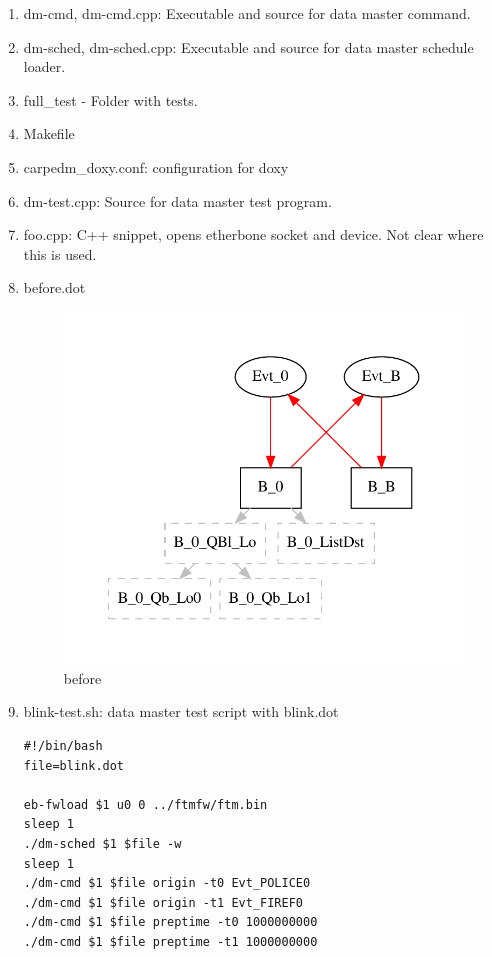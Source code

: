 \documentclass[12pt,a4paper]{report}
\begin{document}
\begin{enumerate}
\item dm-cmd, dm-cmd.cpp: Executable and source for data master command.
\item dm-sched, dm-sched.cpp: Executable and source for data master schedule loader.
\item full\_test - Folder with tests.
\item Makefile
\item carpedm\_doxy.conf: configuration for doxy
\item dm-test.cpp: Source for data master test program.
\item foo.cpp: C++ snippet, opens etherbone socket and device. Not clear where this is used.
\item before.dot
    \begin{figure}
        \centering 
        \includegraphics{TestPattern/before.pdf}
        \caption{before}
        \label{fig:before}
    \end{figure}
\item blink-test.sh: data master test script with blink.dot
\begin{verbatim}
#!/bin/bash
file=blink.dot

eb-fwload $1 u0 0 ../ftmfw/ftm.bin
sleep 1
./dm-sched $1 $file -w
sleep 1
./dm-cmd $1 $file origin -t0 Evt_POLICE0
./dm-cmd $1 $file origin -t1 Evt_FIREF0
./dm-cmd $1 $file preptime -t0 1000000000
./dm-cmd $1 $file preptime -t1 1000000000


\end{verbatim}
\end{enumerate}
\end{document}
